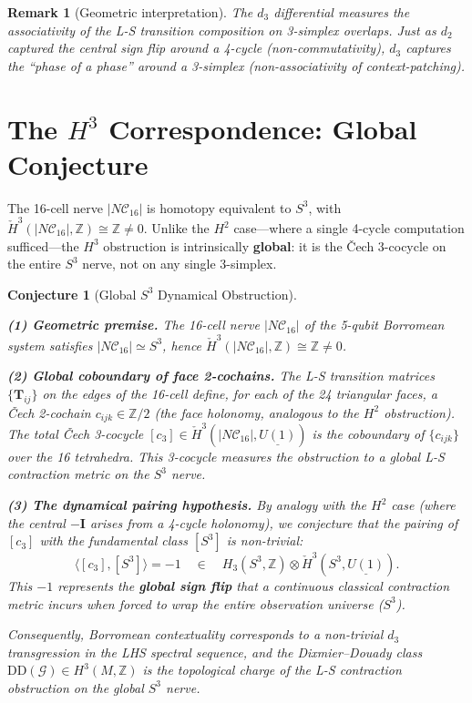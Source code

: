 \documentclass[11pt]{article}
\newtheorem{remark}[theorem]{Remark}
\newtheorem{conjecture}[theorem]{Conjecture}
\begin{document}
\begin{remark}[Geometric interpretation]
The $d_3$ differential measures the associativity of the L-S transition
composition on 3-simplex overlaps. Just as $d_2$ captured the central
sign flip around a 4-cycle (non-commutativity), $d_3$ captures the
``phase of a phase'' around a 3-simplex (non-associativity of
context-patching).
\end{remark}

\section{The $H^3$ Correspondence: Global Conjecture}
\label{sec:conjecture}

The 16-cell nerve $|N\mathcal{C}_{16}|$ is homotopy equivalent to $S^3$,
with $\check{H}^3(|N\mathcal{C}_{16}|, \mathbb{Z}) \cong \mathbb{Z} \neq 0$.
Unlike the $H^2$ case---where a single 4-cycle computation sufficed---the
$H^3$ obstruction is intrinsically \textbf{global}: it is the \v{C}ech
3-cocycle on the entire $S^3$ nerve, not on any single 3-simplex.

\begin{conjecture}[Global $S^3$ Dynamical Obstruction]
\label{conj:ls-h3}

\noindent\textbf{(1) Geometric premise.}
The 16-cell nerve $|N\mathcal{C}_{16}|$ of the 5-qubit Borromean system
satisfies $|N\mathcal{C}_{16}| \simeq S^3$, hence
$\check{H}^3(|N\mathcal{C}_{16}|, \mathbb{Z}) \cong \mathbb{Z} \neq 0$.

\noindent\textbf{(2) Global coboundary of face 2-cochains.}
The L-S transition matrices $\{\mathbf{T}_{ij}\}$ on the edges of the
16-cell define, for each of the 24 triangular faces, a \v{C}ech
2-cochain $c_{ijk} \in \mathbb{Z}/2$ (the face holonomy, analogous to
the $H^2$ obstruction). The total \v{C}ech 3-cocycle
$[c_3] \in \check{H}^3(|N\mathcal{C}_{16}|, \underline{U(1)})$ is the
coboundary of $\{c_{ijk}\}$ over the 16 tetrahedra. This 3-cocycle
measures the obstruction to a global L-S contraction metric on the
$S^3$ nerve.

\noindent\textbf{(3) The dynamical pairing hypothesis.}
By analogy with the $H^2$ case (where the central $-\mathbf{I}$ arises
from a 4-cycle holonomy), we conjecture that the pairing of $[c_3]$
with the fundamental class $[S^3]$ is non-trivial:
\[
\langle [c_3], [S^3] \rangle = -1
\quad\in\quad H_3(S^3, \mathbb{Z}) \otimes \check{H}^3(S^3, \underline{U(1)}).
\]
This $-1$ represents the \textbf{global sign flip} that a continuous
classical contraction metric incurs when forced to wrap the entire
observation universe ($S^3$).

Consequently, Borromean contextuality corresponds to a non-trivial
$d_3$ transgression in the LHS spectral sequence, and the
Dixmier--Douady class $\mathrm{DD}(\mathcal{G}) \in H^3(M, \mathbb{Z})$
is the topological charge of the L-S contraction obstruction on the
global $S^3$ nerve.
\end{conjecture}
\end{document}
